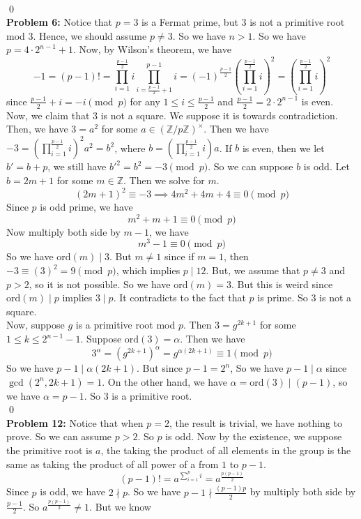 \documentclass[12pt]{amsart}
\newcommand{\Z}{\mathbb{Z}}
\newcommand{\ord}{\mathrm{ord}}
\begin{document}
\\\qed\\
\textbf{Problem 6:} Notice that $p=3$ is a Fermat prime, but 3 is not a primitive root mod $3$. Hence, we should assume $p\neq 3$. So we have $n>1$. So we have $p=4\cdot 2^{n-1}+1$. Now, by Wilson's theorem, we have 
\[-1=(p-1)!=\prod_{i=1}^{\frac{p-1}{2}}i\prod_{i=\frac{p-1}{2}+1}^{p-1}i=(-1)^{\frac{p-1}{2}}(\prod_{i=1}^{\frac{p-1}{2}}i)^2=(\prod_{i=1}^{\frac{p-1}{2}}i)^2\]
since $\frac{p-1}{2}+i=-i\pmod p$ for any $1\leq i\leq \frac{p-1}{2}$ and $\frac{p-1}{2}=2\cdot 2^{n-1}$ is even.\\
Now, we claim that $3$ is not a square. We suppose it is towards contradiction. Then, we have $3=a^2$ for some $a\in (\Z/p\Z)^\times $. Then we have $-3=(\prod_{i=1}^{\frac{p-1}{2}}i)^2a^2=b^2$, where $b=(\prod_{i=1}^{\frac{p-1}{2}}i)a$. If $b$ is even, then we let $b'=b+p$, we still have $b'^2=b^2=-3\pmod p$. So we can suppose $b$ is odd. Let $b=2m+1$ for some $m\in\Z$. Then we solve for $m$. 
\[(2m+1)^2\equiv -3\implies 4m^2+4m+4\equiv 0\pmod p\]
Since $p$ is odd prime, we have 
\[m^2+m+1\equiv 0\pmod p\]
Now multiply both side by $m-1$, we have 
\[m^3-1\equiv 0\pmod p\]
So we have $\ord(m)\mid 3$. But $m\neq 1$ since if $m=1$, then $-3\equiv(3)^2=9\pmod p$, which implies $p\mid 12$. But, we assume that $p\neq 3$ and $p>2$, so it is not possible. So we have $\ord(m)=3$. But this is weird since $\ord(m)\mid p$ implies $3\mid p$. It contradicts to the fact that $p$ is prime. So $3$ is not a square.\\
Now, suppose $g$ is a primitive root mod $p$. Then $3=g^{2k+1}$ for some $1\leq k\leq 2^{n-1}-1$. Suppose $\ord(3)=\alpha$. Then we have 
\[3^{\alpha}=(g^{2k+1})^\alpha=g^{\alpha(2k+1)}\equiv 1\pmod p\]
So we have $p-1\mid \alpha(2k+1)$. But since $p-1=2^n$, So we have $p-1\mid \alpha$ since $\gcd (2^n,2k+1)=1$. On the other hand, we have $\alpha=\ord(3)\mid (p-1)$, so we have $\alpha=p-1$. So $3$ is a primitive root. 
\\\qed\\
\textbf{Problem 12:}
Notice that when $p=2$, the result is trivial, we have nothing to prove. So we can assume $p>2$. So $p$ is odd. Now by the existence, we suppose the primitive root is $a$, the taking the product of all elements in the group is the same as taking the product of all power of a from $1$ to $p-1$.
\[(p-1)!=a^{\sum_{i=1}^pi}=a^{\frac{p(p-1)}{2}}\]
Since $p$ is odd, we have $2\nmid p$. So we have $p-1\nmid \frac{(p-1)p}{2}$ by multiply both side by $\frac{p-1}{2}$. So $a^{\frac{p(p-1)}{2}}\neq 1$. But we know 
\end{document}
